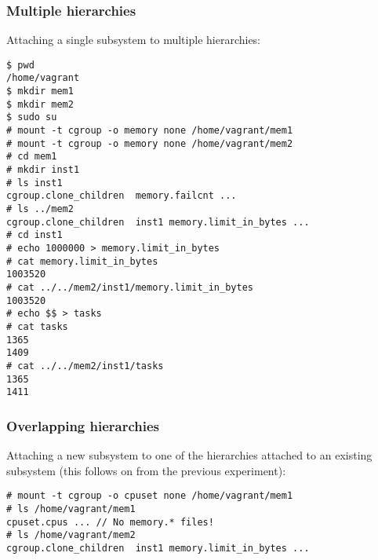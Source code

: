 \documentclass[a4paper,twoside,12pt]{article}
\begin{document}
\subsubsection{Multiple hierarchies}

Attaching a single subsystem to multiple hierarchies:
{\scriptsize \begin{verbatim}
$ pwd
/home/vagrant
$ mkdir mem1
$ mkdir mem2
$ sudo su
# mount -t cgroup -o memory none /home/vagrant/mem1
# mount -t cgroup -o memory none /home/vagrant/mem2
# cd mem1
# mkdir inst1
# ls inst1
cgroup.clone_children  memory.failcnt ...
# ls ../mem2
cgroup.clone_children  inst1 memory.limit_in_bytes ...
# cd inst1
# echo 1000000 > memory.limit_in_bytes
# cat memory.limit_in_bytes
1003520
# cat ../../mem2/inst1/memory.limit_in_bytes
1003520
# echo $$ > tasks
# cat tasks
1365
1409
# cat ../../mem2/inst1/tasks
1365
1411
\end{verbatim}}

\subsubsection{Overlapping hierarchies}

Attaching a new subsystem to one of the hierarchies attached to an existing subsystem (this follows on from the previous experiment):
{\scriptsize \begin{verbatim}
# mount -t cgroup -o cpuset none /home/vagrant/mem1
# ls /home/vagrant/mem1
cpuset.cpus ... // No memory.* files!
# ls /home/vagrant/mem2
cgroup.clone_children  inst1 memory.limit_in_bytes ...
\end{verbatim}}
\end{document}
